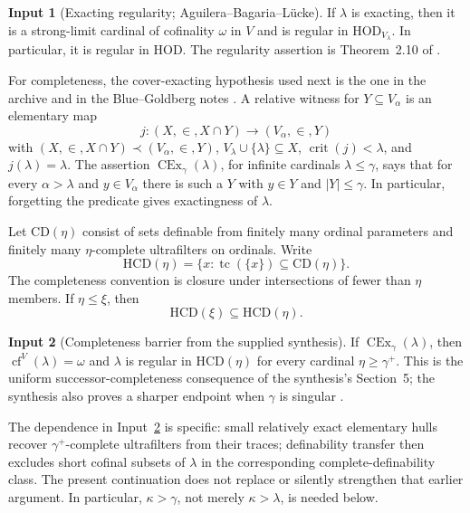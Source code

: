 \documentclass[11pt,letterpaper]{article}
\theoremstyle{definition}
\newtheorem{inputthm}{Input}
\numberwithin{equation}{section}
\newcommand{\HOD}{\mathrm{HOD}}
\newcommand{\HCD}{\mathrm{HCD}}
\newcommand{\CD}{\mathrm{CD}}
\newcommand{\cf}{\operatorname{cf}}
\newcommand{\crit}{\operatorname{crit}}
\newcommand{\CEx}{\operatorname{CEx}}
\begin{document}
\begin{inputthm}[Exacting regularity; Aguilera--Bagaria--L\"ucke]\label{in:ex}
If $\lambda$ is exacting, then it is a strong-limit cardinal of cofinality $\omega$ in $V$ and is regular in $\HOD_{V_\lambda}$. In particular, it is regular in $\HOD$. The regularity assertion is Theorem~2.10 of \cite{abl}.
\end{inputthm}

For completeness, the cover-exacting hypothesis used next is the one in the archive and in the Blue--Goldberg notes \cite{cover}. A relative witness for $Y\subseteq V_\alpha$ is an elementary map
\[
j:(X,\in,X\cap Y)\longrightarrow(V_\alpha,\in,Y)
\]
with $(X,\in,X\cap Y)\prec(V_\alpha,\in,Y)$,
$V_\lambda\cup\{\lambda\}\subseteq X$, $\crit(j)<\lambda$, and $j(\lambda)=\lambda$.
The assertion $\CEx_\gamma(\lambda)$, for infinite cardinals $\lambda\le\gamma$, says that for every $\alpha>\lambda$ and $y\in V_\alpha$ there is such a $Y$ with $y\in Y$ and $|Y|\le\gamma$. In particular, forgetting the predicate gives exactingness of $\lambda$.

Let $\CD(\eta)$ consist of sets definable from finitely many ordinal parameters and finitely many $\eta$-complete ultrafilters on ordinals. Write
\[
\HCD(\eta)=\{x:\operatorname{tc}(\{x\})\subseteq\CD(\eta)\}.
\]
The completeness convention is closure under intersections of fewer than $\eta$ members. If $\eta\le\xi$, then
\begin{equation}\label{eq:hcdmono}
\HCD(\xi)\subseteq\HCD(\eta).
\end{equation}

\begin{inputthm}[Completeness barrier from the supplied synthesis]\label{in:barrier}
If $\CEx_\gamma(\lambda)$, then $\cf^V(\lambda)=\omega$ and $\lambda$ is regular in $\HCD(\eta)$ for every cardinal $\eta\ge\gamma^+$. This is the uniform successor-completeness consequence of the synthesis's Section~5; the synthesis also proves a sharper endpoint when $\gamma$ is singular \cite{synthesis}.
\end{inputthm}

The dependence in Input~\ref{in:barrier} is specific: small relatively exact elementary hulls recover $\gamma^+$-complete ultrafilters from their traces; definability transfer then excludes short cofinal subsets of $\lambda$ in the corresponding complete-definability class. The present continuation does not replace or silently strengthen that earlier argument. In particular, $\kappa>\gamma$, not merely $\kappa>\lambda$, is needed below.
\end{document}
